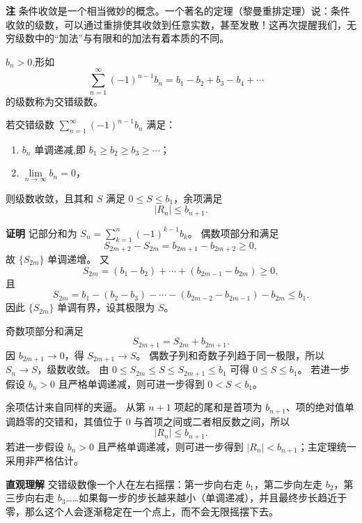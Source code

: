 \documentclass[fontset=fandol]{ctexart}
\newenvironment{custom}[1]{\par\noindent\textbf{#1}\quad}{\par\vspace{0.8em}}
\newenvironment{remark}{\par\noindent\textbf{注}\quad}{\par\vspace{0.8em}}
\newenvironment{intuition}{\par\noindent\textbf{直观理解}\quad}{\par\vspace{0.8em}}
\begin{document}
\begin{remark}
	条件收敛是一个相当微妙的概念。一个著名的定理（黎曼重排定理）说：条件收敛的级数，可以通过重排使其收敛到任意实数，甚至发散！这再次提醒我们，无穷级数中的“加法”与有限和的加法有着本质的不同。
\end{remark}



\begin{definition}[交错级数]
$b_n > 0$,形如
\[
\sum_{n=1}^{\infty} (-1)^{n-1} b_n = b_1 - b_2 + b_3 - b_4 + \cdots \quad 
\]
的级数称为交错级数。
\end{definition}

\begin{theorem}[莱布尼茨判别法]
若交错级数 \(\sum_{n=1}^{\infty} (-1)^{n-1} b_n\) 满足：
\begin{enumerate}
\item \(b_n\) 单调递减,即 \(b_1 \geq b_2 \geq b_3 \geq \cdots\)；
\item \(\lim\limits_{n\to\infty} b_n = 0\)，
\end{enumerate}
则级数收敛，且其和 \(S\) 满足 \(\boxed{0\leq S\leq b_1}\)，余项满足
\[
\boxed{|R_n|\le b_{n+1}}.
\]
\end{theorem}

\begin{custom}{证明}
记部分和为 $S_n=\sum\limits_{k=1}^{n}(-1)^{k-1}b_k$。 偶数项部分和满足
\[
S_{2m+2}-S_{2m}=b_{2m+1}-b_{2m+2}\ge0,
\]
故 $\{S_{2m}\}$ 单调递增。 又
\[
S_{2m}=(b_1-b_2)+\cdots+(b_{2m-1}-b_{2m})\ge0,
\]
且
\[
S_{2m}=b_1-(b_2-b_3)-\cdots-(b_{2m-2}-b_{2m-1})-b_{2m}\le b_1.
\]
因此 $\{S_{2m}\}$ 单调有界，设其极限为 $S$。

奇数项部分和满足
\[
S_{2m+1}=S_{2m}+b_{2m+1}.
\]
因 $b_{2m+1}\to0$，得 $S_{2m+1}\to S$。 偶数子列和奇数子列趋于同一极限，所以 $S_n\to S$，级数收敛。 由 $0\le S_{2m}\le S\le S_{2m+1}\le b_1$ 可得 $0\le S\le b_1$。 若进一步假设 $b_n>0$ 且严格单调递减，则可进一步得到 $0<S<b_1$。

余项估计来自同样的夹逼。 从第 $n+1$ 项起的尾和是首项为 $b_{n+1}$、项的绝对值单调趋零的交错和，其值位于 $0$ 与首项之间或二者相反数之间，所以
\[
|R_n|\le b_{n+1}.
\]
若进一步假设 $b_n>0$ 且严格单调递减，则可进一步得到 $|R_n|<b_{n+1}$；主定理统一采用非严格估计。
\end{custom}

\begin{intuition}
交错级数像一个人在左右摇摆：第一步向右走 \(b_1\)，第二步向左走 \(b_2\)，第三步向右走 \(b_3\)……如果每一步的步长越来越小（单调递减），并且最终步长趋近于零，那么这个人会逐渐稳定在一个点上，而不会无限摇摆下去。
\end{intuition}
\end{document}
